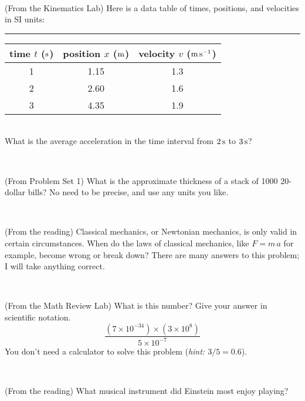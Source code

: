 \documentclass[12pt, letterpaper]{article}
\begin{document}
\vfill ~

\begin{problem} (From the Kinematics Lab)
Here is a data table of times, positions, and velocities in SI units:\\
\rule{1.0in}{0pt}\begin{tabular}{c|c|c}
time $t$ ($\mathrm{s}$) & position $x$ ($\mathrm{m}$) & velocity $v$ ($\mathrm{m}\,\mathrm{s}^{-1}$) \\
\hline
1 & 1.15 & 1.3 \\
2 & 2.60 & 1.6 \\
3 & 4.35 & 1.9 \\
\hline
\end{tabular}\\
What is the average acceleration in the time interval from $2\,\mathrm{s}$ to $3\,\mathrm{s}$?
\end{problem}


\vfill ~


\clearpage


\begin{problem} (From Problem Set 1)
What is the approximate thickness of a stack of 1000 20-dollar bills?
No need to be precise, and use any units you like.
\end{problem}


\vfill ~

\begin{problem} (From the reading)
Classical mechanics, or Newtonian mechanics, is only valid in certain
circumstances. When do the laws of classical mechanics, like $F =
m\,a$ for example, become wrong or break down? There are many answers
to this problem; I will take anything correct.
\end{problem}


\vfill ~

\begin{problem} (From the Math Review Lab)
What is this number? Give your answer in scientific notation.
$$
\frac{(7\times10^{-34})\times(3\times10^8)}{5\times10^{-7}}
$$
You don't need a calculator to solve this problem (\textit{hint: $3/5=0.6$}).
\end{problem}


\vfill ~

\begin{problem} (From the reading)
What musical instrument did Einstein most enjoy playing?
\end{problem}


\vfill ~


\cleardoublepage
\end{document}
